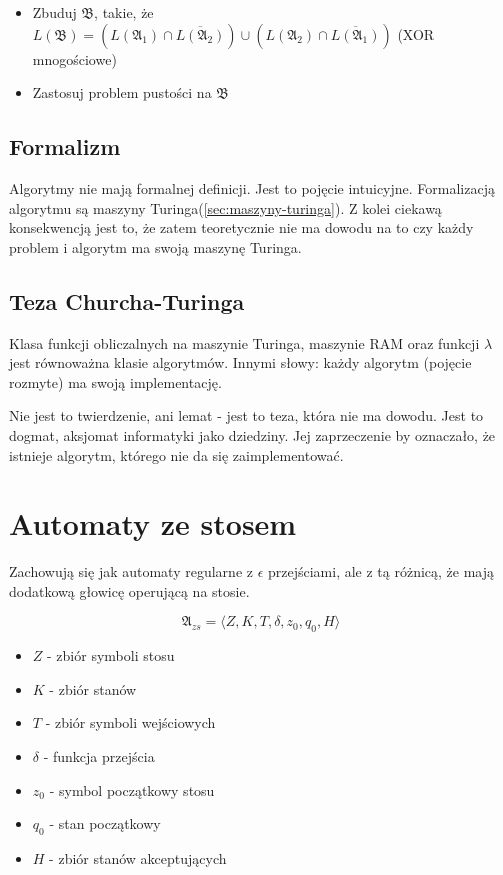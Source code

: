 \documentclass{../notatki}
\begin{document}
\begin{itemize}
  \item Zbuduj $\mathfrak{B}$, takie, że $L(\mathfrak{B}) =
    (L(\mathfrak{A_1}) \cap \overline{L(\mathfrak{A_2})}) \cup
    (L(\mathfrak{A_2}) \cap \overline{L(\mathfrak{A_1})})$ (XOR mnogościowe)
  \item Zastosuj problem pustości na $\mathfrak{B}$
\end{itemize}

\subsection{Formalizm}

Algorytmy nie mają formalnej definicji. Jest to pojęcie intuicyjne.
Formalizacją algorytmu są maszyny Turinga(\ref{sec:maszyny-turinga}).
Z kolei ciekawą konsekwencją jest to, że zatem teoretycznie nie ma dowodu na to
czy każdy problem i algorytm ma swoją maszynę Turinga.

\subsection{Teza Churcha-Turinga}

Klasa funkcji obliczalnych na maszynie Turinga, maszynie RAM oraz
funkcji $\lambda$ jest równoważna klasie algorytmów. Innymi słowy: każdy
algorytm (pojęcie rozmyte) ma swoją implementację.

Nie jest to twierdzenie, ani lemat - jest to teza, która nie ma dowodu. Jest to
dogmat, aksjomat informatyki jako dziedziny. Jej zaprzeczenie by oznaczało, że
istnieje algorytm, którego nie da się zaimplementować.

\section{Automaty ze stosem}

Zachowują się jak automaty regularne z $\epsilon$ przejściami, ale z tą różnicą,
że mają dodatkową głowicę operującą na stosie.

$$
\mathfrak{A}_{zs} = \langle Z, K, T, \delta, z_0, q_0, H \rangle
$$

\begin{itemize}
  \item $Z$ - zbiór symboli stosu
  \item $K$ - zbiór stanów
  \item $T$ - zbiór symboli wejściowych
  \item $\delta$ - funkcja przejścia
  \item $z_0$ - symbol początkowy stosu
  \item $q_0$ - stan początkowy
  \item $H$ - zbiór stanów akceptujących
\end{itemize}
\end{document}
